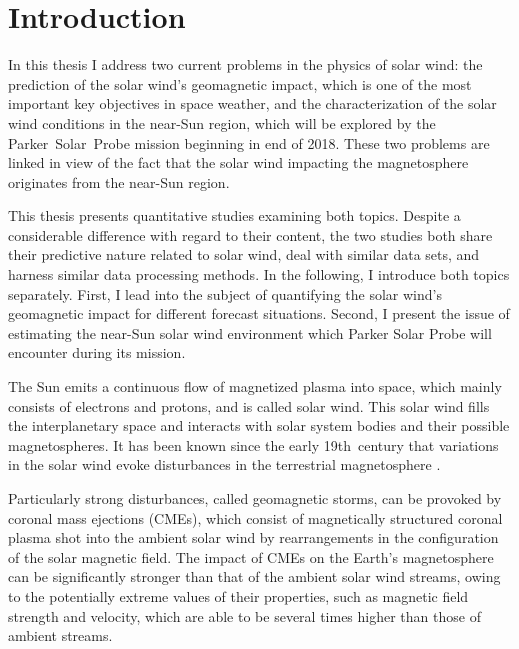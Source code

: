 
\chapter{Introduction}
\label{chap:introduction}

In this thesis I address two current problems in the physics of solar wind: the prediction of the solar wind's geomagnetic impact, which is one of the most important key objectives in space weather, and the characterization of the solar wind conditions in the near-Sun region, which will be explored by the Parker~Solar~Probe mission beginning in end of 2018. These two problems are linked in view of the fact that the solar wind impacting the magnetosphere originates from the near-Sun region.

This thesis presents quantitative studies examining both topics. Despite a considerable difference with regard to their content, the two studies both share their predictive nature related to solar wind, deal with similar data sets, and harness similar data processing methods.
In the following, I introduce both topics separately. First, I lead into the subject of quantifying the solar wind's geomagnetic impact for different forecast situations. Second, I present the issue of estimating the near-Sun solar wind environment which Parker Solar Probe will encounter during its mission.

\bigskip


The Sun emits a continuous flow of magnetized plasma into space, which mainly consists of electrons and protons, and is called solar wind. This solar wind fills the interplanetary space and interacts with solar system bodies and their possible magnetospheres. It has been known since the early 19th~century that variations in the solar wind evoke disturbances in the terrestrial magnetosphere \citep{Bartels1962}.

Particularly strong disturbances, called geomagnetic storms, can be provoked by coronal mass ejections (CMEs), which consist of magnetically structured coronal plasma shot into the ambient solar wind by rearrangements in the configuration of the solar magnetic field. The impact of CMEs on the Earth's magnetosphere can be significantly stronger than that of the ambient solar wind streams, owing to the potentially extreme values of their properties, such as magnetic field strength and velocity, which are able to be several times higher than those of ambient streams.

